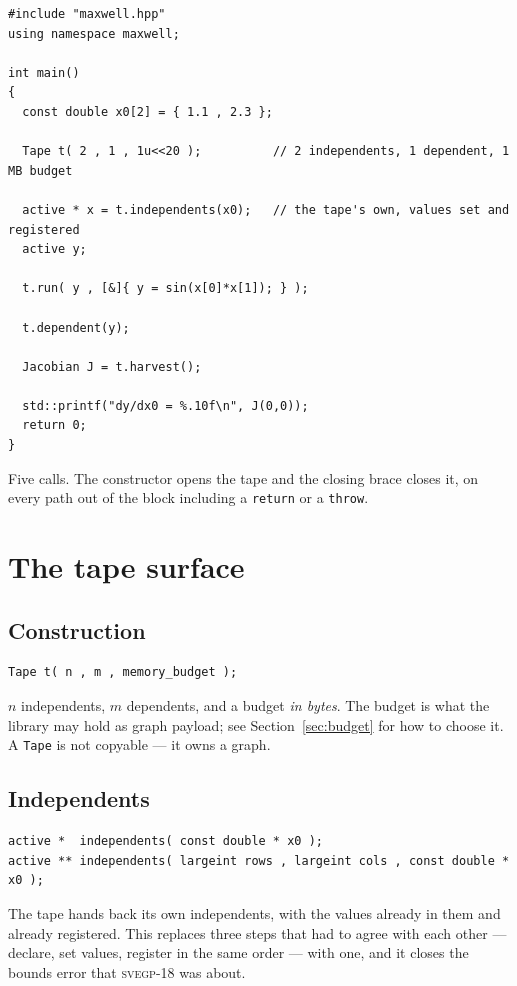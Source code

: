 \documentclass[11pt,a4paper]{report}
\newcommand{\svegp}[1]{\textsc{svegp-#1}}
\newcommand{\code}[1]{\texttt{#1}}
\begin{document}
\begin{lstlisting}
#include "maxwell.hpp"
using namespace maxwell;

int main()
{
  const double x0[2] = { 1.1 , 2.3 };

  Tape t( 2 , 1 , 1u<<20 );          // 2 independents, 1 dependent, 1 MB budget

  active * x = t.independents(x0);   // the tape's own, values set and registered
  active y;

  t.run( y , [&]{ y = sin(x[0]*x[1]); } );

  t.dependent(y);

  Jacobian J = t.harvest();

  std::printf("dy/dx0 = %.10f\n", J(0,0));
  return 0;
}
\end{lstlisting}

Five calls. The constructor opens the tape and the closing brace closes it, on
every path out of the block including a \code{return} or a \code{throw}.

\chapter{The tape surface}

\section{Construction}

\begin{lstlisting}
Tape t( n , m , memory_budget );
\end{lstlisting}

$n$ independents, $m$ dependents, and a budget \emph{in bytes}. The budget is
what the library may hold as graph payload; see Section~\ref{sec:budget} for how
to choose it. A \code{Tape} is not copyable --- it owns a graph.

\section{Independents}
\label{sec:independents}

\begin{lstlisting}
active *  independents( const double * x0 );
active ** independents( largeint rows , largeint cols , const double * x0 );
\end{lstlisting}

The tape hands back its own independents, with the values already in them and
already registered. This replaces three steps that had to agree with each other
--- declare, set values, register in the same order --- with one, and it closes
the bounds error that \svegp{18} was about.
\end{document}
